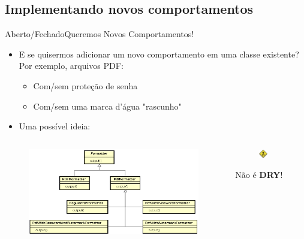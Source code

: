 \documentclass[10pt]{beamer}
\begin{document}
\subsection{Implementando novos comportamentos}
\begin{frame}{Aberto/Fechado}{Queremos Novos Comportamentos!}

\begin{itemize}
  \item E se quisermos adicionar um novo comportamento em uma classe existente? Por exemplo, arquivos PDF:
  \begin{itemize}
    \item Com/sem proteção de senha
    \item Com/sem uma marca d'água "rascunho"
  \end{itemize}
  \pause
  \item Uma possível ideia:
\end{itemize}

\begin{columns}[T]

  \begin{column}{0.7\textwidth}
    \begin{figure}
      \includegraphics[width=1.3\textwidth]{images/badFormatterDesign.png}
    \end{figure}
  \end{column}

  \pause

  \begin{column}{0.3\textwidth}
    \begin{figure}
      \includegraphics[width=0.35\textwidth]{images/toxicSign.png}
    \end{figure}
    \centering \large Não é \textbf{DRY}!
  \end{column}

\end{columns}

\end{frame}
\end{document}
